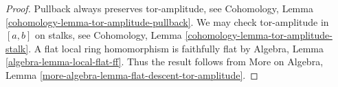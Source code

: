 \documentclass{stacks-project}
\theoremstyle{plain}
\theoremstyle{definition}
\theoremstyle{remark}
\numberwithin{equation}{subsection}
\begin{document}
\begin{proof}
Pullback always preserves tor-amplitude, see
Cohomology, Lemma \ref{cohomology-lemma-tor-amplitude-pullback}.
We may check tor-amplitude in $[a, b]$ on stalks, see
Cohomology, Lemma \ref{cohomology-lemma-tor-amplitude-stalk}.
A flat local ring homomorphism is faithfully flat by
Algebra, Lemma \ref{algebra-lemma-local-flat-ff}.
Thus the result follows from
More on Algebra, Lemma
\ref{more-algebra-lemma-flat-descent-tor-amplitude}.
\end{proof}
\end{document}
